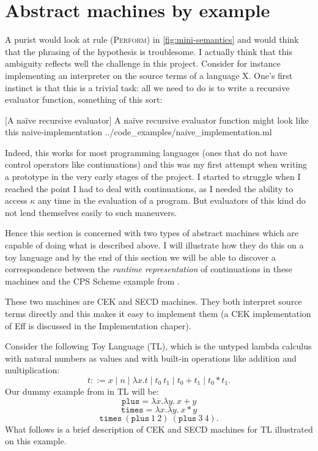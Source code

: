 \documentclass[class=article, crop=false]{standalone}
\begin{document}
\section{Abstract machines by example}

A purist would look at rule \textsc{(Perform)} in \autoref{fig:mini-semantics}
and would think that the phrasing of the hypothesis is troublesome. I actually
think that this ambiguity reflects well the challenge in this project. Consider
for instance implementing an interpreter on the source terms of a language X.
One's first instinct is that this is a trivial task: all we need to do is to
write a recursive evaluator function, something of this sort:

{[A naïve recursive evaluator] A naïve recursive evaluator function might look like this}
{naive-implementation}
{../code_examples/naive_implementation.ml}

Indeed, this works for most programming languages (ones that do not have control
operators like continuations) and this was my first attempt when writing a
 prototype in the very early stages of the project. I started to struggle
when I reached the point I had to deal with continuations, as I needed the
ability to access $\kappa$ any time in the evaluation of a program. But
evaluators of this kind do not lend themselves easily to such maneuvers.

Hence this section is concerned with two types of abstract machines which are
capable of doing what is described above. I will illustrate how they do this on
a toy language and by the end of this section we will be able to discover a
correspondence between the \emph{runtime representation} of continuations in
these machines and the CPS Scheme example from .

These two machines are CEK and SECD machines. They both interpret source terms
directly and this makes it easy to implement them (a CEK implementation of Eff
is discussed in the Implementation chaper).

Consider the following Toy Language (TL), which is the untyped lambda calculus
with natural numbers as values and with built-in operations like addition and
multiplication:
$$ t ::= x \mid n \mid \lambda x. t \mid t_0\ t_1 \mid t_0 + t_1 \mid t_0 * t_1.$$
Our dummy example from  in TL will be:
$$ \mathtt{plus} = \lambda x. \lambda y.\ x + y $$
$$ \mathtt{times} = \lambda x. \lambda y.\ x * y $$
$$ \mathtt{times}\ (\mathtt{plus}\ 1\ 2)\ (\mathtt{plus}\ 3\ 4).$$
What follows is a brief description of CEK and SECD machines for TL illustrated
on this example.
\end{document}
